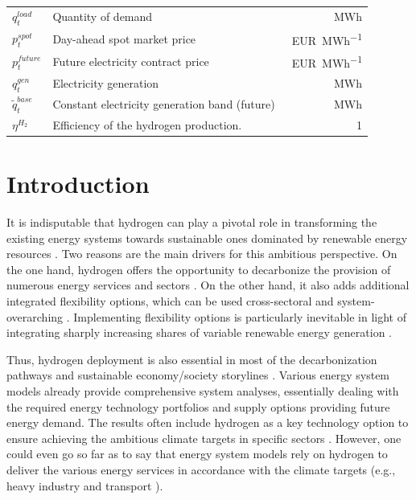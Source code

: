 \documentclass[review]{elsarticle}
\begin{document}
\begin{center}
\begin{tabular}{lm{8cm}r}
		{$q_{t}^{load}$} & Quantity of demand & \SI{}{MWh}\\
		{$p_{t}^{spot}$} & Day-ahead spot market price & \SI{}{EUR\per MWh}\\
		{$p_{t}^{future}$} & Future electricity contract price & \SI{}{EUR\per MWh}\\
		{$q_{t}^{gen}$} & Electricity generation & \SI{}{MWh}\\
		{$\tilde{q}_{t}^{base}$} & Constant electricity generation band (future)& \SI{}{MWh}\\
		{$\eta^{H_2}$} & Efficiency of the hydrogen	production.& \SI{}{1}\\	
		\hline
	\end{tabular}
\end{center}
\newpage
\section{Introduction}
It is indisputable that hydrogen can play a pivotal role in transforming the existing energy systems towards sustainable ones dominated by renewable energy resources \cite{dunn2002hydrogen}. Two reasons are the main drivers for this ambitious perspective. On the one hand, hydrogen offers the opportunity to decarbonize the provision of numerous energy services and sectors \cite{midilli2008hydrogen}. On the other hand, it also adds additional integrated flexibility options, which can be used cross-sectoral and system-overarching \cite{kueppers2021decarbonization}. Implementing flexibility options is particularly inevitable in light of integrating sharply increasing shares of variable renewable energy generation \cite{kroniger2014hydrogen}.\vspace{0.3cm}

Thus, hydrogen deployment is also essential in most of the decarbonization pathways and sustainable economy/society storylines \cite{herbst2021scenario}. Various energy system models already provide comprehensive system analyses, essentially dealing with the required energy technology portfolios and supply options providing future energy demand. The results often include hydrogen as a key technology option to ensure achieving the ambitious climate targets in specific sectors \cite{lux2020supply}. However, one could even go so far as to say that energy system models rely on hydrogen to deliver the various energy services in accordance with the climate targets (e.g., heavy industry \cite{rissman2020technologies} and transport \cite{zhang2016times}).\vspace{0.3cm}
\end{document}
